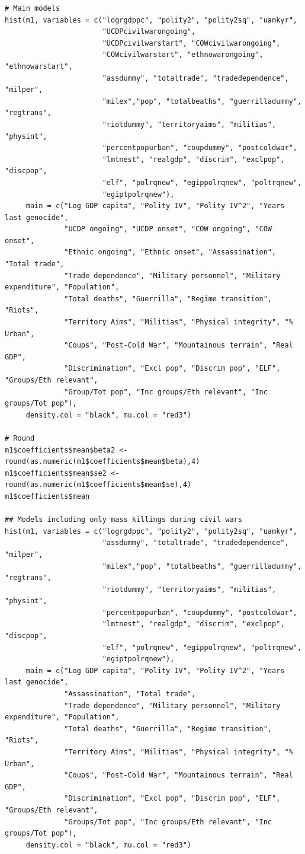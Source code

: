 \documentclass[a4paper,12pt]{article}
\begin{document}
\begin{verbatim}
# Main models
hist(m1, variables = c("logrgdppc", "polity2", "polity2sq", "uamkyr",
                       "UCDPcivilwarongoing",
                       "UCDPcivilwarstart", "COWcivilwarongoing",
                       "COWcivilwarstart", "ethnowarongoing", "ethnowarstart",
                       "assdummy", "totaltrade", "tradedependence", "milper",
                       "milex","pop", "totalbeaths", "guerrilladummy", "regtrans",
                       "riotdummy", "territoryaims", "militias", "physint",
                       "percentpopurban", "coupdummy", "postcoldwar",
                       "lmtnest", "realgdp", "discrim", "exclpop", "discpop",
                       "elf", "polrqnew", "egippolrqnew", "poltrqnew",
                       "egiptpolrqnew"),
     main = c("Log GDP capita", "Polity IV", "Polity IV^2", "Years last genocide",
              "UCDP ongoing", "UCDP onset", "COW ongoing", "COW onset", 
              "Ethnic ongoing", "Ethnic onset", "Assassination", "Total trade", 
              "Trade dependence", "Military personnel", "Military expenditure", "Population", 
              "Total deaths", "Guerrilla", "Regime transition", "Riots",
              "Territory Aims", "Militias", "Physical integrity", "% Urban",
              "Coups", "Post-Cold War", "Mountainous terrain", "Real GDP",
              "Discrimination", "Excl pop", "Discrim pop", "ELF", "Groups/Eth relevant", 
              "Group/Tot pop", "Inc groups/Eth relevant", "Inc groups/Tot pop"),
     density.col = "black", mu.col = "red3")

# Round
m1$coefficients$mean$beta2 <- round(as.numeric(m1$coefficients$mean$beta),4)
m1$coefficients$mean$se2 <- round(as.numeric(m1$coefficients$mean$se),4)
m1$coefficients$mean

## Models including only mass killings during civil wars
hist(m1, variables = c("logrgdppc", "polity2", "polity2sq", "uamkyr",
                       "assdummy", "totaltrade", "tradedependence", "milper",
                       "milex","pop", "totalbeaths", "guerrilladummy", "regtrans",
                       "riotdummy", "territoryaims", "militias", "physint",
                       "percentpopurban", "coupdummy", "postcoldwar",
                       "lmtnest", "realgdp", "discrim", "exclpop", "discpop",
                       "elf", "polrqnew", "egippolrqnew", "poltrqnew",
                       "egiptpolrqnew"),
     main = c("Log GDP capita", "Polity IV", "Polity IV^2", "Years last genocide",
              "Assassination", "Total trade", 
              "Trade dependence", "Military personnel", "Military expenditure", "Population", 
              "Total deaths", "Guerrilla", "Regime transition", "Riots",
              "Territory Aims", "Militias", "Physical integrity", "% Urban",
              "Coups", "Post-Cold War", "Mountainous terrain", "Real GDP",
              "Discrimination", "Excl pop", "Discrim pop", "ELF", "Groups/Eth relevant", 
              "Groups/Tot pop", "Inc groups/Eth relevant", "Inc groups/Tot pop"),
     density.col = "black", mu.col = "red3")
\end{verbatim}
\end{document}
